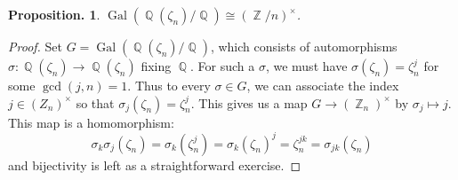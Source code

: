 \documentclass[11pt, a4paper]{memoir}
\DeclareMathOperator{\Q}{{\mathbb{Q}}}
\DeclareMathOperator{\Z}{{\mathbb{Z}}}
\theoremstyle{change}
\newtheorem{proposition}[theorem]{Proposition.}
\theoremstyle{plain}
\theoremstyle{nonumberplain}
\newtheorem{proof}{Proof}
\DeclareMathOperator{\Gal}{Gal}
\begin{document}
\begin{proposition}
    $\Gal(\Q(\zeta_n)/\Q)\cong(\Z/n)^\times$.
\end{proposition}
\begin{proof}
    Set $G=\Gal(\Q(\zeta_n)/\Q)$, which consists of automorphisms $\sigma:\Q(\zeta_n)\to\Q(\zeta_n)$ fixing $\Q$.
    For such a $\sigma$, we must have $\sigma(\zeta_n)=\zeta_n^j$ for some $\gcd(j,n)=1$.
    Thus to every $\sigma\in G$, we can associate the index $j\in(Z_n)^\times$ so that $\sigma_j(\zeta_n)=\zeta_n^j$.
    This gives us a map $G\to(\Z_n)^\times$ by $\sigma_j\mapsto j$.
    This map is a homomorphism:
    \begin{equation*}
        \sigma_k\sigma_j(\zeta_n)=\sigma_k(\zeta_n^j)=\sigma_k(\zeta_n)^j=\zeta_n^{jk}=\sigma_{jk}(\zeta_n)
    \end{equation*}
    and bijectivity is left as a straightforward exercise.
\end{proof}
\end{document}
